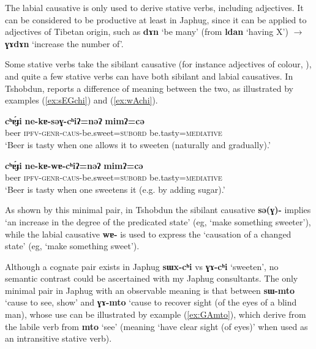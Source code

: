 \documentclass[oneside,a4paper,11pt]{article}
\newcommand{\ipa}[1]{\textbf{{\phon\mbox{#1}}}} %
\newcommand{\refb}[1]{(\ref{#1})}
\begin{document}
The labial causative is only used to derive stative verbs, including adjectives. It can be considered to be  productive at least in Japhug, since it can be applied to adjectives of Tibetan origin, such as \ipa{dɤn} `be many' (from \ipa{ldan} `having X') $\rightarrow$ \ipa{ɣɤdɤn} `increase the number of'.

Some stative verbs take the sibilant causative (for instance adjectives of colour, \citealt[183]{jacques15causative}), and quite a few stative verbs can have both sibilant and labial causatives. In Tshobdun, \citet{jackson06paisheng, jackson14morpho} reports a difference of meaning between the two, as illustrated by examples \refb{ex:sEGchi} and \refb{ex:wAchi}.

\begin{exe}
\ex \label{ex:sEGchi}
\gll \ipa{cʰɐ́ɟi}	\ipa{ne-kɐ-səɣ-cʰiʔ=nəʔ}	\ipa{mimʔ=cə} \\
beer \textsc{ipfv-genr-caus}-be.sweet=\textsc{subord} be.tasty=\textsc{mediative} \\
\glt `Beer is tasty when one allows it to sweeten (naturally and gradually).'
\end{exe}

 \begin{exe}
\ex \label{ex:wAchi}
\gll \ipa{cʰɐ́ɟi}	\ipa{ne-kɐ-wɐ-cʰiʔ=nəʔ}	\ipa{mimʔ=cə} \\
beer \textsc{ipfv-genr-caus}-be.sweet=\textsc{subord} be.tasty=\textsc{mediative} \\
\glt `Beer is tasty when one sweetens it (e.g. by adding sugar).'
\end{exe}

As shown by this minimal pair, in Tshobdun the sibilant causative \ipa{sə(ɣ)-} implies `an increase in the degree  of the predicated state' (eg, `make something sweeter'), while the labial causative \ipa{wɐ-} is used to express the `causation of a changed state' (eg, `make something sweet').

Although a cognate pair exists in Japhug \ipa{sɯx-cʰi} vs \ipa{ɣɤ-cʰi} `sweeten', no semantic contrast could be ascertained with my Japhug consultants. The only minimal pair in Japhug with an observable meaning is that between \ipa{sɯ-mto} `cause to see, show' and \ipa{ɣɤ-mto} `cause to recover sight (of the eyes of a blind man), whose use can be illustrated by example \refb{ex:GAmto}, which derive from the labile verb from \ipa{mto} `see' (meaning `have clear sight (of eyes)' when used as an intransitive stative verb).
\end{document}
